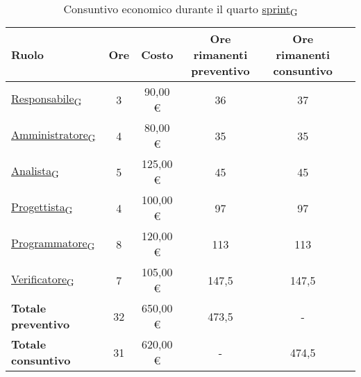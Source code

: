 \begin{table}[!h]
	\centering
	\begin{tabular}{ | l | c | c | c | c | c | }
		\hline
		\textbf{Ruolo}             & \textbf{Ore} & \textbf{Costo} & \textbf{Ore rimanenti preventivo} & \textbf{Ore rimanenti consuntivo} \\
		\hline
		\href{https://7last.github.io/docs/pb/documentazione-interna/glossario\#responsabile}{Responsabile\textsubscript{G}}               & 3            & 90,00 €        & 36                                & 37                                \\
		\href{https://7last.github.io/docs/pb/documentazione-interna/glossario\#amministratore}{Amministratore\textsubscript{G}}             & 4            & 80,00 €        & 35                                & 35                                \\
		\href{https://7last.github.io/docs/pb/documentazione-interna/glossario\#analista}{Analista\textsubscript{G}}                   & 5            & 125,00 €       & 45                                & 45                                \\
		\href{https://7last.github.io/docs/pb/documentazione-interna/glossario\#progettista}{Progettista\textsubscript{G}}                & 4            & 100,00 €       & 97                                & 97                                \\
		\href{https://7last.github.io/docs/pb/documentazione-interna/glossario\#programmatore}{Programmatore\textsubscript{G}}              & 8            & 120,00 €       & 113                               & 113                               \\
		\href{https://7last.github.io/docs/pb/documentazione-interna/glossario\#verificatore}{Verificatore\textsubscript{G}}               & 7            & 105,00 €       & 147,5                             & 147,5                             \\
		\hline
		\textbf{Totale preventivo} & 32           & 650,00 €       & 473,5                             & -                                 \\
		\hline
		\textbf{Totale consuntivo} & 31           & 620,00 €       & -                                 & 474,5                             \\
		\hline
	\end{tabular}
	\caption{Consuntivo economico durante il quarto \href{https://7last.github.io/docs/pb/documentazione-interna/glossario\#sprint}{sprint\textsubscript{G}}}
	
\end{table}

